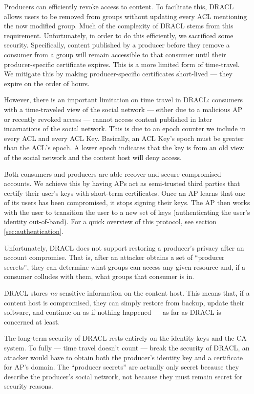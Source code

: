 \documentclass[pdftex,12pt,a4papaer,twoside,notitlepage]{report}
\begin{document}
Producers can efficiently revoke access to content. To facilitate this, DRACL
allows users to be removed from groups without updating every ACL mentioning the
now modified group. Much of the complexity of DRACL stems from this requirement.
Unfortunately, in order to do this efficiently, we sacrificed some security.
Specifically, content published by a producer before they remove a consumer from
a group will remain accessible to that consumer until their producer-specific
certificate expires. This is a more limited form of time-travel. We mitigate
this by making producer-specific certificates short-lived --- they expire on the
order of hours.

However, there is an important limitation on time travel in DRACL: consumers
with a time-traveled view of the social network --- either due to a malicious AP
or recently revoked access --- cannot access content published in later
incarnations of the social network. This is due to an epoch counter we include
in every ACL and every ACL Key. Basically, an ACL Key's epoch must be greater
than the ACL's epoch. A lower epoch indicates that the key is from an old view
of the social network and the content host will deny access.

Both consumers and producers are able recover and secure compromised accounts.
We achieve this by having APs act as semi-trusted third parties that certify
their user's keys with short-term certificates. Once an AP learns that one of
its users has been compromised, it stops signing their keys. The AP then works
with the user to transition the user to a new set of keys (authenticating the
user's identity out-of-band). For a quick overview of this protocol, see section
\cref{sec:authentication}.

\label{par:restore-privacy}
Unfortunately, DRACL does not support restoring a producer's privacy after an
account compromise. That is, after an attacker obtains a set of ``producer
secrets'', they can determine what groups can access any given resource and, if
a consumer colludes with them, what groups that consumer is in.

DRACL stores \emph{no} sensitive information on the content host. This means
that, if a content host is compromised, they can simply restore from backup,
update their software, and continue on as if nothing happened --- as far as
DRACL is concerned at least.

The long-term security of DRACL rests entirely on the identity keys and the CA
system. To fully --- time travel doesn't count --- break the security of DRACL,
an attacker would have to obtain both the producer's identity key and a
certificate for AP's domain. The ``producer secrets'' are actually only secret
because they describe the producer's social network, not because they must
remain secret for security reasons.
\end{document}
